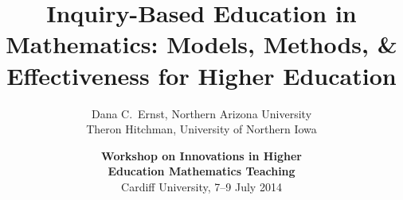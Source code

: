 \documentclass[10pt,handout]{beamer}
\begin{document}

\title[Inquiry-Based Education in Mathematics]
{\large \textbf{Inquiry-Based Education in Mathematics: Models, Methods, \& Effectiveness for Higher Education}}
\author[D.C.~Ernst and TJ Hitchman]{Dana C.~Ernst, Northern Arizona University\\
Theron Hitchman, University of Northern Iowa}

\vspace{1em}

\date{\textbf{Workshop on Innovations in Higher\\ Education Mathematics Teaching}\\
Cardiff University, 7--9 July 2014}

\frame{\titlepage}


\begin{frame}

\vfill
\begin{center}
\end{center}
\vfill

\end{frame}


\begin{frame}

\end{frame}


\begin{frame}

\end{frame}

\end{document}

